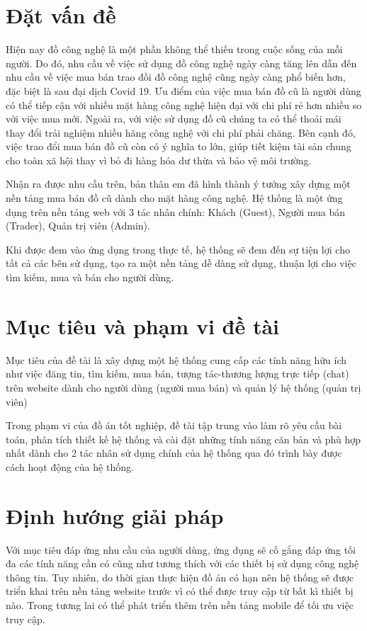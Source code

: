 \documentclass[../DoAn.tex]{subfiles}
\begin{document}
\section{Đặt vấn đề}
\label{section:1.1}
Hiện nay đồ công nghệ là một phần không thể thiếu trong cuộc sống của mỗi
người. Do đó, nhu cầu về việc sử dụng đồ công nghệ ngày càng tăng lên dẫn đến nhu cầu về việc mua bán trao đồi đồ công nghệ cũng ngày càng phổ biến hơn, đặc biệt là sau đại dịch Covid 19. Ưu điểm của việc mua bán đồ cũ là người dùng có thể tiếp cận với nhiều mặt hàng công nghệ hiện đại với chi phí rẻ hơn nhiều so với việc mua mới. Ngoài ra, với việc sử dụng đồ cũ chúng ta có thể thoải mái thay đổi trải nghiệm nhiều hãng công nghệ với chi phí phải chăng. Bên cạnh đó, việc trao đổi mua bán đồ cũ còn có ý nghĩa to lớn, giúp tiết kiệm tài sản chung cho toàn xã hội thay vì bỏ đi hàng hóa dư thừa và bảo vệ môi trường.

Nhận ra được nhu cầu trên, bản thân em đã hình thành ý tưởng xây dựng một nền tảng mua bán đồ cũ dành cho mặt hàng công nghệ. Hệ thống là một ứng dụng trên nền tảng web với 3 tác nhân chính: Khách (Guest), Người mua bán (Trader), Quản trị viên (Admin).

Khi được đem vào ứng dụng trong thực tế, hệ thống sẽ đem đến sự tiện lợi cho tất cả các bên sử dụng, tạo ra một nền tảng dễ dàng sử dụng, thuận lợi cho việc tìm kiếm, mua và bán cho người dùng.

\section{Mục tiêu và phạm vi đề tài}
\label{section:1.2}
Mục tiêu của đề tài là xây dựng một hệ thống cung cấp các tính năng hữu ích như việc đăng tin, tìm kiếm, mua bán, tượng tác-thương lượng trực tiếp (chat) trên website dành cho người dùng (người mua bán) và quản lý hệ thống (quản trị viên)

Trong phạm vi của đồ án tốt nghiệp, đề tài tập trung vào làm rõ yêu cầu bài toán, phân tích thiết kế hệ thống và cài đặt những tính năng căn bản và phù hợp nhất dành cho 2 tác nhân sử dụng chính của hệ thống qua đó trình bày được cách hoạt động của hệ thống.

\section{Định hướng giải pháp}
\label{section:1.3}
Với mục tiêu đáp ứng nhu cầu của người dùng, ứng dụng sẽ cố gắng đáp ứng tối đa các tính năng cần có cũng như tương thích với các thiết bị sử dụng công nghệ thông tin. Tuy nhiên, do thời gian thực hiện đồ án có hạn nên hệ thống sẽ được triển khai trên nền tảng website trước vì có thể được truy cập từ bất kì thiết bị nào. Trong tương lai có thể phát triển thêm trên nền tảng mobile để tối ưu việc truy cập.
\end{document}
